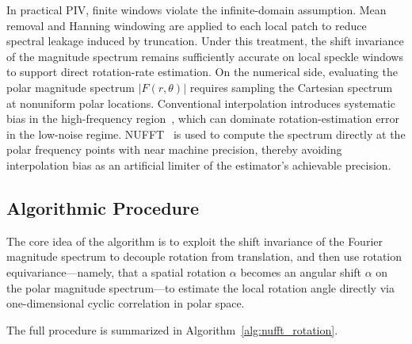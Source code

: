 \documentclass[lettersize,journal]{IEEEtran}
\begin{document}
In practical PIV, finite windows violate the infinite-domain assumption.
Mean removal and Hanning windowing are applied to each local patch to reduce spectral leakage induced by truncation.
Under this treatment, the shift invariance of the magnitude spectrum remains sufficiently accurate on local speckle windows to support direct rotation-rate estimation.
On the numerical side, evaluating the polar magnitude spectrum $|F(r,\theta)|$ requires sampling the Cartesian spectrum at nonuniform polar locations.
Conventional interpolation introduces systematic bias in the high-frequency region~\cite{Press2007},
which can dominate rotation-estimation error in the low-noise regime.
NUFFT~\cite{Barnett2019,Barnett2021} is used
to compute the spectrum directly at the polar frequency points with near machine precision,
thereby avoiding interpolation bias as an artificial limiter of the estimator's achievable precision.

\subsection{Algorithmic Procedure}
\label{sec:algorithm}

The core idea of the algorithm is to exploit the shift invariance of the Fourier magnitude spectrum
to decouple rotation from translation,
and then use rotation equivariance---namely, that a spatial rotation $\alpha$ becomes an angular shift $\alpha$ on the polar magnitude spectrum---to estimate the local rotation angle directly via one-dimensional cyclic correlation in polar space.

The full procedure is summarized in Algorithm~\ref{alg:nufft_rotation}.
\end{document}
